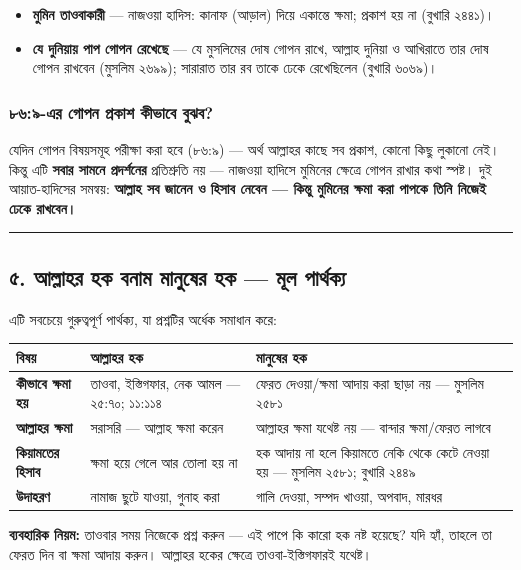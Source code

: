 \begin{itemize}
\item \textbf{মুমিন তাওবাকারী} — নাজওয়া হাদিস: কানাফ (আড়াল) দিয়ে একান্তে ক্ষমা; প্রকাশ হয় না (বুখারি ২৪৪১)।
\item \textbf{যে দুনিয়ায় পাপ গোপন রেখেছে} — যে মুসলিমের দোষ গোপন রাখে, আল্লাহ দুনিয়া ও আখিরাতে তার দোষ গোপন রাখবেন (মুসলিম ২৬৯৯); সারারাত তার রব তাকে ঢেকে রেখেছিলেন (বুখারি ৬০৬৯)।
\end{itemize}
\subsubsection*{৮৬:৯-এর গোপন প্রকাশ কীভাবে বুঝব?}

যেদিন গোপন বিষয়সমূহ পরীক্ষা করা হবে (৮৬:৯) — অর্থ আল্লাহর কাছে সব প্রকাশ, কোনো কিছু লুকানো নেই। কিন্তু এটি \textbf{সবার সামনে প্রদর্শনের} প্রতিশ্রুতি নয় — নাজওয়া হাদিসে মুমিনের ক্ষেত্রে গোপন রাখার কথা স্পষ্ট। দুই আয়াত-হাদিসের সমন্বয়: \textbf{আল্লাহ সব জানেন ও হিসাব নেবেন — কিন্তু মুমিনের ক্ষমা করা পাপকে তিনি নিজেই ঢেকে রাখবেন।}

\medskip\hrule\medskip

\subsection*{৫. আল্লাহর হক বনাম মানুষের হক — মূল পার্থক্য}

এটি সবচেয়ে গুরুত্বপূর্ণ পার্থক্য, যা প্রশ্নটির অর্ধেক সমাধান করে:

\begin{table}[h]\centering\small
\begin{tabular}{lll}
বিষয় & আল্লাহর হক & মানুষের হক \\
\hline
\textbf{কীভাবে ক্ষমা হয়} & তাওবা, ইস্তিগফার, নেক আমল — ২৫:৭০; ১১:১১৪ & ফেরত দেওয়া/ক্ষমা আদায় করা ছাড়া নয় — মুসলিম ২৫৮১ \\
\textbf{আল্লাহর ক্ষমা} & সরাসরি — আল্লাহ ক্ষমা করেন & আল্লাহর ক্ষমা যথেষ্ট নয় — বান্দার ক্ষমা/ফেরত লাগবে \\
\textbf{কিয়ামতের হিসাব} & ক্ষমা হয়ে গেলে আর তোলা হয় না & হক আদায় না হলে কিয়ামতে নেকি থেকে কেটে নেওয়া হয় — মুসলিম ২৫৮১; বুখারি ২৪৪৯ \\
\textbf{উদাহরণ} & নামাজ ছুটে যাওয়া, গুনাহ করা & গালি দেওয়া, সম্পদ খাওয়া, অপবাদ, মারধর \\
\hline
\end{tabular}
\end{table}

\textbf{ব্যবহারিক নিয়ম:} তাওবার সময় নিজেকে প্রশ্ন করুন — এই পাপে কি কারো হক নষ্ট হয়েছে? যদি হ্যাঁ, তাহলে তা ফেরত দিন বা ক্ষমা আদায় করুন। আল্লাহর হকের ক্ষেত্রে তাওবা-ইস্তিগফারই যথেষ্ট।

